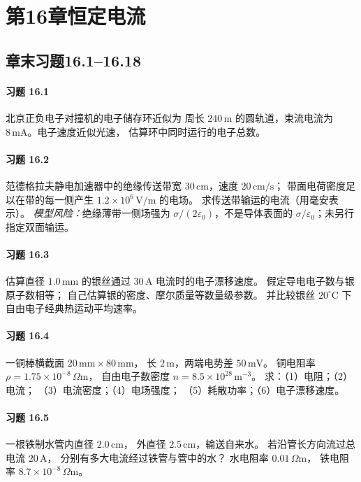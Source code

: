 \section*{第16章\quad 恒定电流}
\subsection*{章末习题16.1--16.18}

\paragraph{习题 16.1}
北京正负电子对撞机的电子储存环近似为
周长 \(240\,\mathrm m\) 的圆轨道，束流电流为
\(8\,\mathrm{mA}\)。电子速度近似光速，
估算环中同时运行的电子总数。

\paragraph{习题 16.2}
范德格拉夫静电加速器中的绝缘传送带宽
\(30\,\mathrm{cm}\)，速度 \(20\,\mathrm{cm/s}\)；
带面电荷密度足以在带的每一侧产生
\(1.2\times10^6\,\mathrm{V/m}\) 的电场。
求传送带输运的电流（用毫安表示）。
\textit{模型风险：}绝缘薄带一侧场强为
\(\sigma/(2\varepsilon_0)\)，不是导体表面的
\(\sigma/\varepsilon_0\)；未另行指定双面输运。

\paragraph{习题 16.3}
估算直径 \(1.0\,\mathrm{mm}\) 的银丝通过
\(30\,\mathrm A\) 电流时的电子漂移速度。
假定导电电子数与银原子数相等；
自己估算银的密度、摩尔质量等数量级参数。
并比较银丝 \(20^\circ\mathrm C\) 下
自由电子经典热运动平均速率。

\paragraph{习题 16.4}
一铜棒横截面
\(20\,\mathrm{mm}\times80\,\mathrm{mm}\)，
长 \(2\,\mathrm m\)，两端电势差
\(50\,\mathrm{mV}\)。
铜电阻率
\(\rho=1.75\times10^{-8}\,\Omega\mathrm m\)，
自由电子数密度
\(n=8.5\times10^{28}\,\mathrm{m^{-3}}\)。
求：（1）电阻；（2）电流；
（3）电流密度；（4）电场强度；
（5）耗散功率；（6）电子漂移速度。

\paragraph{习题 16.5}
一根铁制水管内直径 \(2.0\,\mathrm{cm}\)，
外直径 \(2.5\,\mathrm{cm}\)，输送自来水。
若沿管长方向流过总电流 \(20\,\mathrm A\)，
分别有多大电流经过铁管与管中的水？
水电阻率 \(0.01\,\Omega\mathrm m\)，
铁电阻率 \(8.7\times10^{-8}\,\Omega\mathrm m\)。

